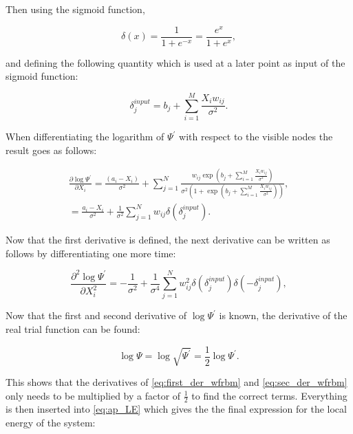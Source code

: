 \documentclass[../main.tex]{subfiles}
\begin{document}
Then using the sigmoid function,

\begin{equation*}
    \delta(x)=\frac{1}{1+e^{-x}}=\frac{e^x}{1+e^x},
\end{equation*}

and defining the following quantity which is used at a later point as input of the sigmoid function:

\begin{equation*}
    \delta_j^{input}=b_j+\sum_{i=1}^M \frac{X_i w_{ij}}{\sigma^2}.
\end{equation*}

When differentiating the logarithm of \ensuremath{\Psi^{\prime}} with respect to the visible nodes the result goes as follows:

\begin{equation}
	\begin{split}
	\frac{\partial \log \Psi^{\prime}}{\partial X_i}=\frac{(a_i-X_i)}{\sigma^2}+\sum_{j=1}^N \frac{w_{ij} \exp \left(b_j+\sum_{i=1}^{M} \frac{X_iw_{ij}}{\sigma^2}\right)}{\sigma^2 \left(1+\exp \left(b_j+\sum_{i=1}^{M} \frac{X_iw_{ij}}{\sigma^2}\right)\right)},\\
	=\frac{a_i-X_i}{\sigma^2}+\frac{1}{\sigma^2}\sum_{j=1}^N w_{ij}\delta(\delta_j^{input}).
	\end{split}
	\label{eq:first_der_wfrbm}
\end{equation}

Now that the first derivative is defined, the next derivative can be written as follows by differentiating one more time:

\begin{equation}
	\frac{\partial^2 \log \Psi^{\prime}}{\partial X_i^2}=-\frac{1}{\sigma^2}+\frac{1}{\sigma^4}\sum_{j=1}^N w_{ij}^2 \delta(\delta_j^{input})\delta(-\delta_j^{input}),
	\label{eq:sec_der_wfrbm}
\end{equation}

Now that the first and second derivative of $\log \Psi^{\prime}$ is known, the derivative of the real trial function can be found:

\begin{equation*}
    \log \Psi=\log \sqrt{\Psi^{\prime}} = \frac{1}{2} \log \Psi^{\prime}.
\end{equation*}

This shows that the derivatives of \autoref{eq:first_der_wfrbm} and \autoref{eq:sec_der_wfrbm} only needs to be multiplied by a factor of $\frac{1}{2}$ to find the correct terms. Everything is then inserted into  \autoref{eq:ap_LE} which gives the the final expression for the local energy of the system:
\end{document}
